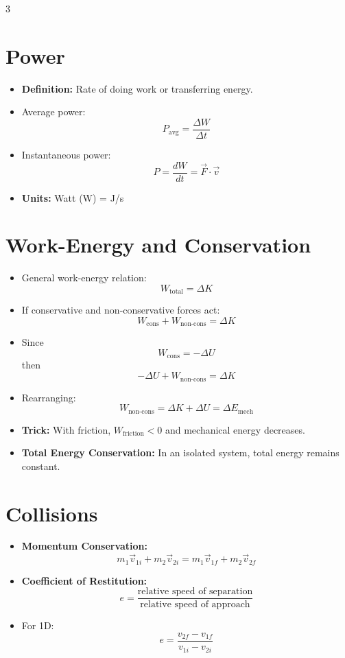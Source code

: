 \documentclass[10pt,a4paper]{article}
\newcommand{\defn}[1]{\textbf{Definition:} #1}
\newcommand{\units}[1]{\textbf{Units:} #1}
\newcommand{\important}[1]{\textbf{#1}}
\newcommand{\trick}[1]{\textbf{Trick:} #1}
\begin{document}
\begin{multicols}{3}
\section{Power}

\begin{itemize}
    \item \defn{Rate of doing work or transferring energy.}
    \item Average power:
    \[
    P_{\text{avg}} = \frac{\Delta W}{\Delta t}
    \]
    \item Instantaneous power:
    \[
    P = \frac{dW}{dt} = \vec{F}\cdot\vec{v}
    \]
    \item \units{Watt (W) = J/s}
\end{itemize}

\section{Work-Energy and Conservation}

\begin{itemize}
    \item General work-energy relation:
    \[
    W_{\text{total}} = \Delta K
    \]
    \item If conservative and non-conservative forces act:
    \[
    W_{\text{cons}} + W_{\text{non-cons}} = \Delta K
    \]
    \item Since
    \[
    W_{\text{cons}} = -\Delta U
    \]
    then
    \[
    -\Delta U + W_{\text{non-cons}} = \Delta K
    \]
    \item Rearranging:
    \[
    W_{\text{non-cons}} = \Delta K + \Delta U = \Delta E_{\text{mech}}
    \]
    \item \trick{With friction, $W_{\text{friction}} < 0$ and mechanical energy decreases.}
    \item \important{Total Energy Conservation:} In an isolated system, total energy remains constant.
\end{itemize}

\section{Collisions}

\begin{itemize}
    \item \important{Momentum Conservation:}
    \[
    m_1\vec{v}_{1i}+m_2\vec{v}_{2i}=m_1\vec{v}_{1f}+m_2\vec{v}_{2f}
    \]
    \item \important{Coefficient of Restitution:}
    \[
    e = \frac{\text{relative speed of separation}}{\text{relative speed of approach}}
    \]
    \item For 1D:
    \[
    e = \frac{v_{2f}-v_{1f}}{v_{1i}-v_{2i}}
    \]
\end{itemize}


\end{multicols}
\end{document}
